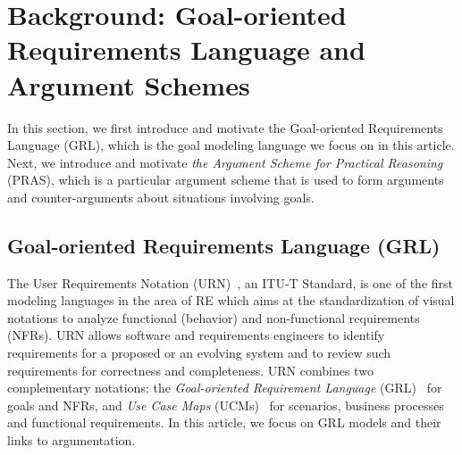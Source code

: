 \documentclass[11.5pt,two column]{llncs}
\begin{document}
\section{Background: Goal-oriented Requirements Language and Argument Schemes}
\label{sect:background}

In this section, we first introduce and motivate the Goal-oriented Requirements Language (GRL), which is the goal modeling language we focus on in this article. Next, we introduce and motivate \emph{the Argument Scheme for Practical Reasoning} (PRAS), which is a particular argument scheme that is used to form arguments and counter-arguments about situations involving goals.

\subsection{Goal-oriented Requirements Language (GRL)}
\label{sect:background:grl}
The User Requirements Notation (URN)~\cite{URN}, an ITU-T Standard, is one of the first modeling languages in the area of RE which aims at the standardization of visual notations to analyze functional (behavior) and non-functional requirements (NFRs). %
URN allows software and requirements engineers to identify requirements for a proposed or an evolving system and to review such requirements for correctness and completeness. URN combines two complementary notations: the \emph{Goal-oriented Requirement Language} (GRL)~\cite{Amyot:2010:EGM:1841349.1841356} for goals and NFRs, and \emph{Use Case Maps} (UCMs)~\cite{Weiss05designing} for scenarios, business processes and functional requirements. In this article, we focus on GRL models and their links to argumentation.  
\end{document}
